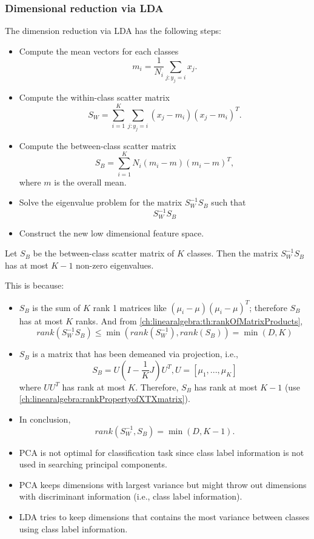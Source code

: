 \begin{refsection}
\subsubsection{Dimensional reduction via LDA}

\begin{method}
	The dimension reduction via LDA has the following steps:
	\begin{itemize}
		\item Compute the mean vectors for each classes
		$$m_i = \frac{1}{N_i}\sum_{j:y_j=i} x_j.$$
		\item Compute the within-class scatter matrix
		$$S_W = \sum_{i=1}^K\sum_{j:y_j=i}  (x_j - m_i)(x_j - m_i)^T.$$
		\item Compute the between-class scatter matrix
		$$S_B = \sum_{i=1}^K N_i (m_i - m)(m_i - m)^T,$$
		where $m$ is the overall mean.
		\item Solve the eigenvalue problem for the matrix $S_W^{-1}S_B$ such that
		$$S_W^{-1}S_B$$
		\item Construct the new low dimensional feature space.
		
	\end{itemize}	
\end{method}


\begin{remark}
	Let $S_B$ be the between-class scatter matrix of $K$ classes. Then the matrix $S_W^{-1}S_B$ has at most $K-1$ non-zero eigenvalues.
	
	This is because:
	\begin{itemize}
		\item $S_B$ is the sum of $K$ rank 1 matrices like $(\mu_i - \mu)(\mu_i - \mu)^T$; therefore $S_B$ has at most $K$ ranks. And from \autoref{ch:linearalgebra:th:rankOfMatrixProducts}, $$rank(S_W^{-1}S_B)\leq \min(rank(S_W^{-1}),rank(S_B)) = \min(D, K)$$
		\item $S_B$ is a matrix that has been demeaned via projection, i.e., 
		$$S_B = U(I - \frac{1}{K}J)U^T, U = [\mu_1,...,\mu_K]$$
		where $UU^T$ has rank at most $K$. Therefore, $S_B$ has rank at most $K-1$ (use \autoref{ch:linearalgebra:rankPropertyofXTXmatrix}). 
		\item In conclusion, 
		$$rank(S_W^{-1},S_B) = \min(D, K-1).$$
	\end{itemize} 		
\end{remark}



\begin{remark}\hfill
	\begin{itemize}
		\item PCA is not optimal for classification task since class label information is not used in searching principal components.
		\item PCA keeps dimensions with largest variance but might throw out dimensions with discriminant information (i.e., class label information).
		\item LDA tries to keep dimensions that contains the most variance between classes using class label information.
	\end{itemize}	
\end{remark}



\end{refsection}
